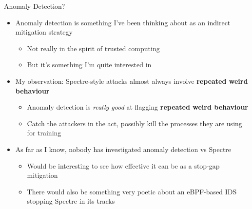 \documentclass[10pt, dvipsnames, aspectratio=169]{beamer}
\begin{document}
\begin{frame}[c]{Anomaly Detection?}{}
  \begin{itemize}
    \item Anomaly detection is something I've been thinking about as an indirect mitigation strategy
    \begin{itemize}
      \item Not really in the spirit of trusted computing
      \item But it's something I'm quite interested in
    \end{itemize}

    \vfill
    \item My observation: Spectre-style attacks almost always involve {\bf repeated weird behaviour}
    \begin{itemize}
      \item Anomaly detection is {\it really good\/} at flagging {\bf repeated weird behaviour}
      \item Catch the attackers in the act, possibly kill the processes they are using for training
    \end{itemize}

    \vfill
    \item As far as I know, nobody has investigated anomaly detection vs Spectre
    \begin{itemize}
      \item Would be interesting to see how effective it can be as a stop-gap mitigation
      \item There would also be something very poetic about an eBPF-based IDS stopping Spectre in its tracks
    \end{itemize}
  \end{itemize}
\end{frame}
\end{document}
